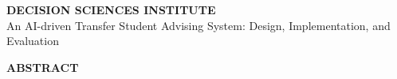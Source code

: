 \documentclass[letterpaper,11pt]{article}
\begin{document}
\begin{center}
\textbf{DECISION SCIENCES INSTITUTE}\\[6pt]
An AI-driven Transfer Student Advising System: Design, Implementation, and Evaluation
\end{center}

\bigskip

%
%
%
%
%
\begin{center}
\textbf{ABSTRACT}
\end{center}
\end{document}

